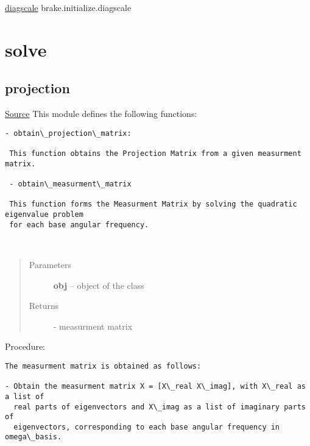 \documentclass[letterpaper,10pt,english]{sphinxmanual}
\begin{document}


{\hyperref[index:diagscale]{diagscale}}  brake.initialize.diagscale




\chapter{solve}
\label{index:solve}

\section{projection}
\label{index:projection}
\href{https://bitbucket.org/akadar/brakesqueal0.1/src/master/brake/solve/projection.py?at=master}{Source}
\label{index:module-brake.solve.projection}
This module defines the following functions:

\begin{Verbatim}[commandchars=\\\{\}]
- obtain\_projection\_matrix:

 This function obtains the Projection Matrix from a given measurment matrix.
 
 - obtain\_measurment\_matrix
 
 This function forms the Measurment Matrix by solving the quadratic eigenvalue problem 
 for each base angular frequency.
\end{Verbatim}

\begin{fulllineitems}
\label{index:brake.solve.projection.obtain_measurment_matrix}~\begin{quote}\begin{description}
\item[{Parameters}] \leavevmode
\textbf{obj} -- object of the class 

\item[{Returns}] \leavevmode
{} - measurment matrix

\end{description}\end{quote}

Procedure:

\begin{Verbatim}[commandchars=\\\{\}]
The measurment matrix is obtained as follows:

- Obtain the measurment matrix X = [X\_real X\_imag], with X\_real as a list of 
  real parts of eigenvectors and X\_imag as a list of imaginary parts of 
  eigenvectors, corresponding to each base angular frequency in omega\_basis.
\end{Verbatim}

\end{fulllineitems}
\end{document}
